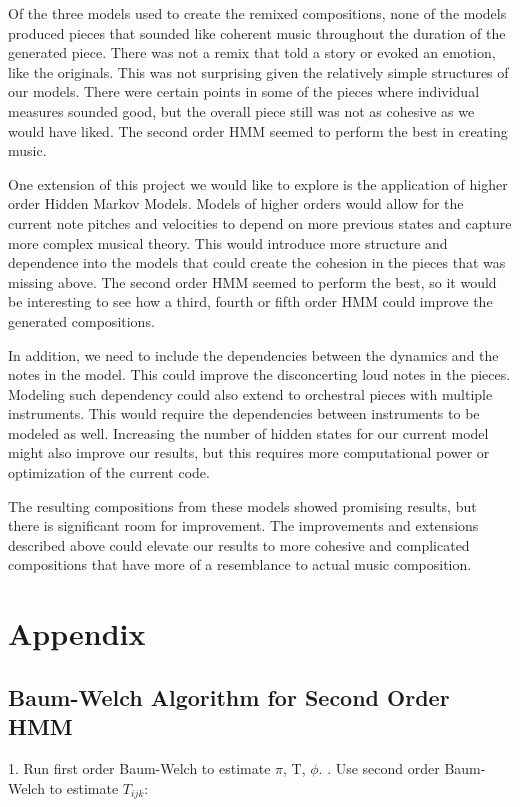\documentclass{article} %
\begin{document}
Of the three models used to create the remixed compositions, none of the models produced pieces that sounded like coherent music throughout the duration of the generated piece. There was not a remix that told a story or evoked an emotion, like the originals. This was not surprising given the relatively simple structures of our models. There were certain points in some of the pieces where individual measures sounded good, but the overall piece still was not as cohesive as we would have liked. The second order HMM seemed to perform the best in creating music. 

One extension of this project we would like to explore is the application of higher order Hidden Markov Models. Models of higher orders would allow for the current note pitches and velocities to depend on more previous states and capture more complex musical theory. This would introduce more structure and dependence into the models that could create the cohesion in the pieces that was missing above. The second order HMM seemed to perform the best, so it would be interesting to see how a third, fourth or fifth order HMM could improve the generated compositions. 

In addition, we need to include the dependencies between the dynamics and the notes in the model. This could improve the disconcerting loud notes in the pieces. Modeling such dependency could also extend to orchestral pieces with multiple instruments. This would require the dependencies between instruments to be modeled as well. Increasing the number of hidden states for our current model might also improve our results, but this requires more computational power or optimization of the current code.

The resulting compositions from these models showed promising results, but there is significant room for improvement. The improvements and extensions described above could elevate our results to more cohesive and complicated compositions that have more of a resemblance to actual music composition. 


\newpage

\section{Appendix}

\subsection{Baum-Welch Algorithm for Second Order HMM}
\label{2ndHMM}
1. Run first order Baum-Welch to estimate $\pi$, T, $\phi$. . Use second order Baum-Welch to estimate $T_{ijk}$:\newline
\end{document}
